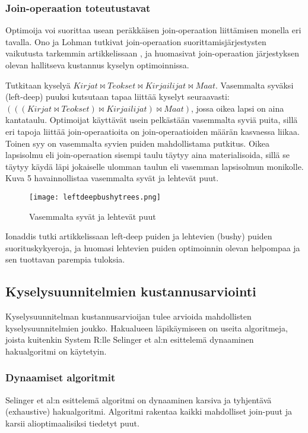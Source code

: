 \documentclass[finnish]{tktltiki2}
\theoremstyle{definition}
\theoremstyle{remark}
\begin{document}
\subsubsection{Join-operaation toteutustavat}
Optimoija voi suorittaa usean peräkkäisen join-operaation liittämisen monella eri tavalla. Ono ja Lohman tutkivat join-operaation suorittamisjärjestysten vaikutusta tarkemmin artikkelissaan \cite{ono1990}, ja huomasivat join-operaation järjestyksen olevan hallitseva kustannus kyselyn optimoinnissa. 

Tutkitaan kyselyä $Kirjat \Join Teokset \Join Kirjailijat \Join Maat$. Vasemmalta syväksi (left-deep) puuksi kutsutaan tapaa liittää kyselyt seuraavasti: $(((Kirjat \Join Teokset) \Join Kirjailijat) \Join Maat)$, jossa oikea lapsi on aina kantataulu. Optimoijat käyttävät usein pelkästään vasemmalta syviä puita, sillä eri tapoja liittää join-operaatioita on join-operaatioiden määrän kasvaessa liikaa. Toinen syy on vasemmalta syvien puiden mahdollistama putkitus. Oikea lapsisolmu eli join-operaation sisempi taulu täytyy aina materialisoida, sillä se täytyy käydä läpi jokaiselle ulomman taulun eli vasemman lapsisolmun monikolle. \cite{ramakrishnan2003database} Kuva 5 havainnollistaa vasemmalta syvät ja lehtevät puut.

\begin{figure}[!h]
  \caption{Vasemmalta syvät ja lehtevät puut}
  \centering
    \texttt{[image: leftdeepbushytrees.png]}
\end{figure}

Ionaddis tutki artikkelissaan \cite{ioannidis1991left} left-deep puiden ja lehtevien (bushy) puiden suorituskykyeroja, ja huomasi lehtevien puiden optimoinnin olevan helpompaa ja sen tuottavan parempia tuloksia. 

\subsection{Kyselysuunnitelmien kustannusarviointi}
Kyselysuunnitelman kustannusarvioijan tulee arvioida mahdollisten kyselysuunnitelmien joukko. Hakualueen läpikäymiseen on useita algoritmeja, joista kuitenkin System R:lle Selinger et al:n esittelemä dynaaminen hakualgoritmi \cite{selinger1979access}on käytetyin. 
\subsubsection{Dynaamiset algoritmit}
Selinger et al:n esittelemä algoritmi on dynaaminen karsiva ja tyhjentävä (exhaustive) hakualgoritmi. Algoritmi rakentaa kaikki mahdolliset join-puut ja karsii alioptimaalisiksi tiedetyt puut.
\end{document}
